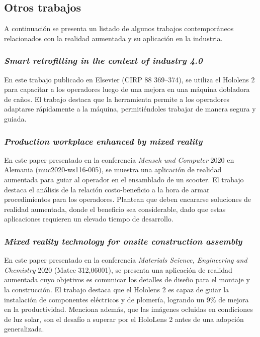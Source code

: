 \subsection{Otros trabajos}

A continuación se presenta un listado de algunos trabajos contemporáneos relacionados con la realidad aumentada y su aplicación en la industria.

\subsubsection{\textit{Smart retrofitting in the context of industry 4.0}}
En este trabajo publicado en Elsevier (CIRP 88 369–374), se utiliza el Hololens 2 para capacitar a los operadores luego de una mejora en una máquina dobladora de caños. El trabajo destaca que la herramienta permite a los operadores adaptarse rápidamente a la máquina, permitiéndoles trabajar de manera segura y guiada.

\subsubsection{\textit{Production workplace enhanced by mixed reality}}
En este paper presentado en la conferencia \textit{Mensch und Computer} 2020 en Alemania (muc2020-ws116-005), se muestra una aplicación de realidad aumentada para guiar al operador en el ensamblado de un scooter. El trabajo destaca el análisis de la relación costo-beneficio a la hora de armar procedimientos para los operadores. Plantean que deben encararse soluciones de realidad aumentada, donde el beneficio sea considerable, dado que estas aplicaciones requieren un elevado tiempo de desarrollo.

\subsubsection{\textit{Mixed reality technology for onsite construction assembly}}
En este paper presentado en la conferencia \textit{Materials Science, Engineering and Chemistry} 2020 (Matec 312,06001), se presenta una aplicación de realidad aumentada cuyo objetivos es comunicar los detalles de diseño para el montaje y la construcción. El trabajo destaca que el Hololens 2 es capaz de guiar la instalación de componentes eléctricos y de plomería, logrando un 9\% de mejora en la productividad. Menciona además, que las imágenes ocluidas en condiciones de luz solar, son el desafío a superar por el HoloLens 2 antes de una adopción generalizada.


